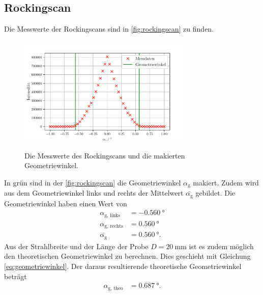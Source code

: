 \subsection{Rockingscan}
Die Messwerte der Rockingscans sind in \autoref{fig:rockingscan} zu finden.
\begin{figure}
    \centering
    \caption{Die Messwerte des Rockingscans und die makierten Geometriewinkel.}
    \includegraphics[width=0.75\textwidth]{content/data/rockingscan.pdf}
    \label{fig:rockingscan}
\end{figure}
In grün sind in der \autoref{fig:rockingscan} die Geometriewinkel $\alpha_\text{g}$ makiert.
Zudem wird aus dem Geometriewinkel links und rechts der Mittelwert $\bar{\alpha_\text{g}}$ gebildet.
Die Geometriewinkel haben einen Wert von 
\begin{align*}
    \alpha_\text{g, links} &= \SI{-0.560}{\degree} \\
    \alpha_\text{g, rechts} &= \SI{0.560}{\degree} \\
    \bar{\alpha_\text{g}} &= \SI{0.560}{\degree}.
\end{align*}
Aus der Strahlbreite und der Länge der Probe $D=\SI{20}{\milli\meter}$ ist es zudem möglich den theoretischen Geometriewinkel zu berechnen.
Dies geschieht mit Gleichung \eqref{eq:geometriewinkel}.
Der daraus resultierende theoretische Geometriewinkel beträgt
\begin{align*}
    \alpha_\text{g, theo} &= \SI{0.687}{\degree}.
\end{align*}
\FloatBarrier
